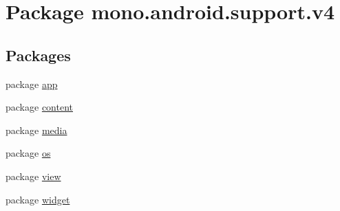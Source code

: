 \hypertarget{namespacemono_1_1android_1_1support_1_1v4}{
\section{Package mono.android.support.v4}
\label{namespacemono_1_1android_1_1support_1_1v4}
}
\subsection*{Packages}
\begin{CompactItemize}
\item 
package \hyperlink{namespacemono_1_1android_1_1support_1_1v4_1_1app}{app}
\item 
package \hyperlink{namespacemono_1_1android_1_1support_1_1v4_1_1content}{content}
\item 
package \hyperlink{namespacemono_1_1android_1_1support_1_1v4_1_1media}{media}
\item 
package \hyperlink{namespacemono_1_1android_1_1support_1_1v4_1_1os}{os}
\item 
package \hyperlink{namespacemono_1_1android_1_1support_1_1v4_1_1view}{view}
\item 
package \hyperlink{namespacemono_1_1android_1_1support_1_1v4_1_1widget}{widget}
\end{CompactItemize}
